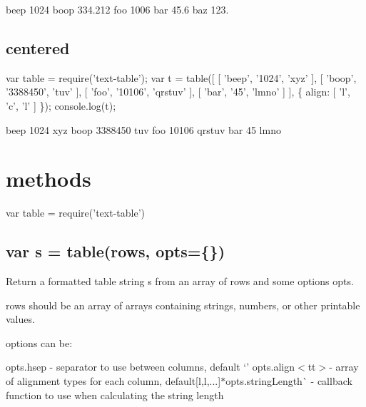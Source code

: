 \begin{DoxyCode}
beep  1024
boop   334.212
foo   1006
bar     45.6
baz    123.
\end{DoxyCode}


\subsection*{centered}


\begin{DoxyCode}
var table = require('text-table');
var t = table([
    [ 'beep', '1024', 'xyz' ],
    [ 'boop', '3388450', 'tuv' ],
    [ 'foo', '10106', 'qrstuv' ],
    [ 'bar', '45', 'lmno' ]
], \{ align: [ 'l', 'c', 'l' ] \});
console.log(t);
\end{DoxyCode}



\begin{DoxyCode}
beep    1024   xyz
boop  3388450  tuv
foo    10106   qrstuv
bar      45    lmno
\end{DoxyCode}


\section*{methods}


\begin{DoxyCode}
var table = require('text-table')
\end{DoxyCode}


\subsection*{var s = table(rows, opts=\{\})}

Return a formatted table string {\ttfamily s} from an array of {\ttfamily rows} and some options {\ttfamily opts}.

{\ttfamily rows} should be an array of arrays containing strings, numbers, or other printable values.

options can be\+:


\begin{DoxyItemize}
\item {\ttfamily opts.\+hsep} -\/ separator to use between columns, default `' \textquotesingle{}{\ttfamily  $\ast$}opts.\+align$<$tt$>$-\/ array of alignment types for each column, default\mbox{[}\textquotesingle{}l\textquotesingle{},\textquotesingle{}l\textquotesingle{},...\mbox{]}{\ttfamily  $\ast$}opts.\+string\+Length\`{} -\/ callback function to use when calculating the string length
\end{DoxyItemize}


